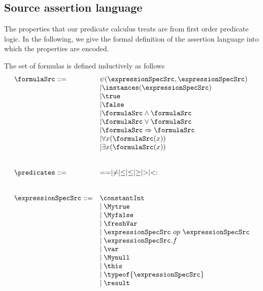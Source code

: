 
\subsection{Source assertion language} \label{formulasSrc}
The properties that our predicate calculus treats are from first order predicate logic.
In the following, we give the formal definition of the assertion language into which 
the properties are encoded.

 

\begin{Formula}[Definition]
The set of formulas is defined inductively as follows
	$$
	\begin{array}{ll}
	\formulaSrc ::= & \psi(\expressionSpecSrc,  \expressionSpecSrc )\\
	  & \vert  \instances(\expressionSpecSrc)\\
	  & \vert \true \\
	  & \vert  \false \\	
	  & \vert \formulaSrc \wedge \formulaSrc \\
	  & \vert \formulaSrc \vee  \formulaSrc \\
	  & \vert \formulaSrc \Rightarrow \formulaSrc \\
	  & \vert \forall x  (  \formulaSrc(x) ) \\
	  & \vert \exists x  ( \formulaSrc (x))	 \\
      
          & \\
	  & \\
	  \predicates ::=  &   == \mid \neq \mid \leq \mid \le \mid \geq \mid > \mid  <: \\
	  & \\
	  & \\
	  \expressionSpecSrc  ::= & \constantInt  \\
	                          & \mid \Mytrue \\ 
	                          & \mid \Myfalse \\
	                          & \mid \freshVar \\
				  & \mid \expressionSpecSrc \ op \ \expressionSpecSrc \\  
				  & \mid \expressionSpecSrc.f \\
				  & \mid \var \\
  			          & \mid \Mynull  \\
				  & \mid \this \\
	                          & \mid \typeof{\expressionSpecSrc} \\
	                          & \mid \result
                                  
	\end{array}
	$$ 
\end{Formula}


